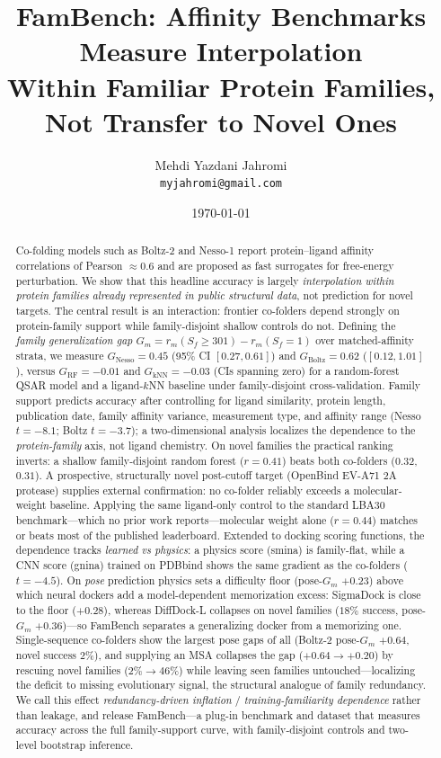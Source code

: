 \documentclass[11pt]{article}
\title{\textbf{FamBench: Affinity Benchmarks Measure Interpolation\\
Within Familiar Protein Families, Not Transfer to Novel Ones}}
\author{Mehdi Yazdani Jahromi\\[2pt]\small \texttt{myjahromi@gmail.com}}
\date{\today}
\begin{document}
\maketitle

\begin{abstract}
\noindent
Co-folding models such as Boltz-2 and Nesso-1 report protein--ligand affinity correlations of
Pearson $\approx 0.6$ and are proposed as fast surrogates for free-energy perturbation. We show
that this headline accuracy is largely \emph{interpolation within protein families already
represented in public structural data}, not prediction for novel targets. The central result is
an interaction: frontier co-folders depend strongly on protein-family support while
family-disjoint shallow controls do not. Defining the \emph{family generalization gap}
$G_m = r_m(S_f{\ge}301) - r_m(S_f{=}1)$ over matched-affinity strata, we measure
$G_{\text{Nesso}}=0.45$ (95\% CI $[0.27,0.61]$) and $G_{\text{Boltz}}=0.62$ ($[0.12,1.01]$),
versus $G_{\text{RF}}=-0.01$ and $G_{\text{kNN}}=-0.03$ (CIs spanning zero) for a random-forest
QSAR model and a ligand-$k$NN baseline under family-disjoint cross-validation. Family support
predicts accuracy after controlling for ligand similarity, protein length, publication date,
family affinity variance, measurement type, and affinity range (Nesso $t=-8.1$; Boltz $t=-3.7$);
a two-dimensional analysis localizes the dependence to the \emph{protein-family} axis, not ligand
chemistry. On novel families the practical ranking inverts: a shallow family-disjoint random
forest ($r=0.41$) beats both co-folders ($0.32$, $0.31$). A prospective, structurally novel
post-cutoff target (OpenBind EV-A71 2A protease) supplies external confirmation: no co-folder
reliably exceeds a molecular-weight baseline. Applying the same ligand-only control to the standard
LBA30 benchmark---which no prior work reports---molecular weight alone ($r=0.44$) matches or beats
most of the published leaderboard. Extended to docking scoring functions, the dependence tracks
\emph{learned vs physics}: a physics score (smina) is family-flat, while a CNN score (gnina) trained
on PDBbind shows the same gradient as the co-folders ($t=-4.5$). On \emph{pose} prediction physics
sets a difficulty floor (pose-$G_m$ $+0.23$) above which neural dockers add a model-dependent
memorization excess: SigmaDock is close to the floor ($+0.28$), whereas DiffDock-L collapses on novel
families ($18\%$ success, pose-$G_m$ $+0.36$)---so FamBench separates a generalizing docker from a
memorizing one. Single-sequence co-folders show the largest pose gaps of all (Boltz-2 pose-$G_m$
$+0.64$, novel success $2\%$), and supplying an MSA collapses the gap ($+0.64\to+0.20$) by rescuing
novel families ($2\%\to46\%$) while leaving seen families untouched---localizing the deficit to
missing evolutionary signal, the structural analogue of family redundancy. We call this effect
\emph{redundancy-driven inflation} / \emph{training-familiarity dependence} rather than leakage, and
release FamBench---a
plug-in benchmark and dataset that measures accuracy across the full family-support curve, with
family-disjoint controls and two-level bootstrap inference.
\end{abstract}
\end{document}

